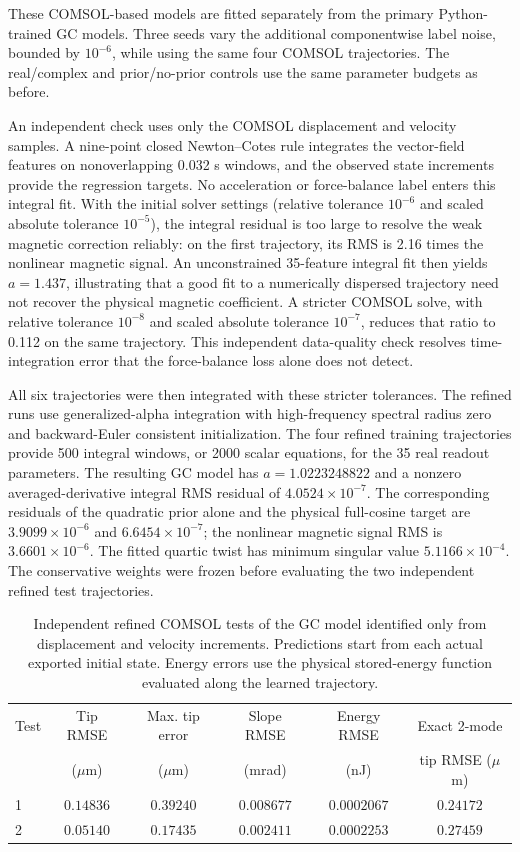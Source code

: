 These COMSOL-based models are fitted separately from the primary
Python-trained GC models. Three seeds vary the
additional componentwise label noise, bounded by $10^{-6}$, while using
the same four COMSOL trajectories. The real/complex and prior/no-prior
controls use the same parameter budgets as before.

An independent check uses only the COMSOL displacement and velocity
samples. A nine-point closed Newton--Cotes rule integrates the vector-field
features on nonoverlapping 0.032 s windows, and the observed state
increments provide the regression targets. No acceleration or
force-balance label enters this integral fit.
With the initial solver settings (relative tolerance $10^{-6}$ and
scaled absolute tolerance $10^{-5}$), the integral residual is too large
to resolve the weak magnetic correction reliably: on the first trajectory,
its RMS is 2.16 times the nonlinear magnetic signal. An unconstrained
35-feature integral fit then yields $a=1.437$, illustrating that a good
fit to a numerically dispersed trajectory need not recover the physical
magnetic coefficient. A stricter COMSOL solve, with relative tolerance
$10^{-8}$ and scaled absolute tolerance $10^{-7}$, reduces that ratio
to 0.112 on the same trajectory. This independent data-quality check
resolves time-integration error that the force-balance loss alone
does not detect.

All six trajectories were then integrated with these stricter
tolerances. The refined runs use
generalized-alpha integration with high-frequency spectral radius zero
and backward-Euler consistent initialization. The four refined training
trajectories provide 500 integral windows, or 2000 scalar equations, for
the 35 real readout parameters. The resulting GC model has
$a=1.0223248822$ and a nonzero averaged-derivative integral RMS residual
of $4.0524\times10^{-7}$. The corresponding residuals of the quadratic
prior alone and the physical full-cosine target are
$3.9099\times10^{-6}$ and $6.6454\times10^{-7}$; the nonlinear magnetic
signal RMS is $3.6601\times10^{-6}$.
The fitted quartic twist has minimum singular value
$5.1166\times10^{-4}$. The conservative weights were frozen before
evaluating the two independent refined test trajectories.

\begin{table}[t]
\centering
\caption{Independent refined COMSOL tests of the GC model identified
only from displacement and velocity increments. Predictions start from
each actual exported initial state. Energy errors use the physical
stored-energy function evaluated along the learned trajectory.}
\label{tab:comsol-integral-tests}
\small
\begin{tabular}{lccccc}
\hline
Test & Tip RMSE & Max. tip error & Slope RMSE & Energy RMSE & Exact 2-mode\\
 & ($\mu$m) & ($\mu$m) & (mrad) & (nJ) & tip RMSE ($\mu$m)\\
\hline
1 & $0.14836$ & $0.39240$ & $0.008677$ & $0.0002067$ & $0.24172$\\
2 & $0.05140$ & $0.17435$ & $0.002411$ & $0.0002253$ & $0.27459$\\
\hline
\end{tabular}
\end{table}

